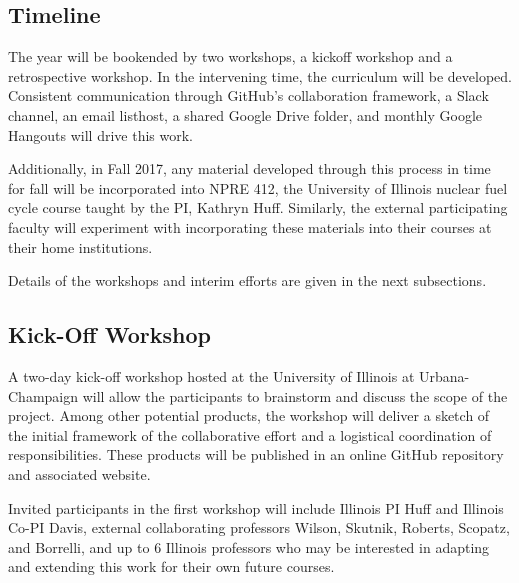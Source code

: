 \documentclass[11pt]{article}
\begin{document}
          \subsection{Timeline}
          The year will be bookended by two workshops, a kickoff workshop 
          and a retrospective workshop. In the intervening time, the curriculum 
          will be developed. Consistent 
          communication through GitHub's collaboration framework, a Slack 
          channel, an email listhost, a shared Google Drive folder, and monthly 
          Google Hangouts will drive this work.

          Additionally, in Fall 2017, any material developed through this 
          process in time for fall will be incorporated into NPRE 412, the 
          University of Illinois nuclear fuel cycle course taught by the PI, 
          Kathryn Huff. Similarly, the external participating faculty will 
          experiment with incorporating these materials into their courses at 
          their home institutions. 


          Details of the workshops and interim efforts are given in the next 
          subsections.

          \subsection{Kick-Off Workshop}
          A two-day kick-off workshop hosted at the University of Illinois at 
          Urbana-Champaign will allow the 
          participants to brainstorm and discuss the scope of the project.
          Among other potential products, the workshop will deliver
          a sketch of the initial framework of the collaborative effort and
          a logistical coordination of responsibilities. These products will
          be published in an online GitHub repository 
          and associated website.

          Invited participants in the first workshop will include Illinois PI Huff 
          and Illinois Co-PI Davis, external collaborating professors Wilson, 
          Skutnik, Roberts, Scopatz, and Borrelli, and up to 6 Illinois professors 
          who may be interested in adapting and extending this work for their own 
          future courses.
\end{document}
